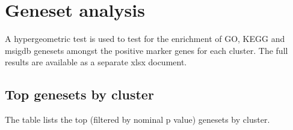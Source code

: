 \section{Geneset analysis}

A hypergeometric test is used to test for the enrichment of GO, KEGG and msigdb genesets amongst the positive marker genes for each cluster. The full results
are available as a separate xlsx document.



\clearpage

\subsection{Top genesets by cluster}

The table lists the top (filtered by nominal p value) genesets by cluster.



\clearpage

